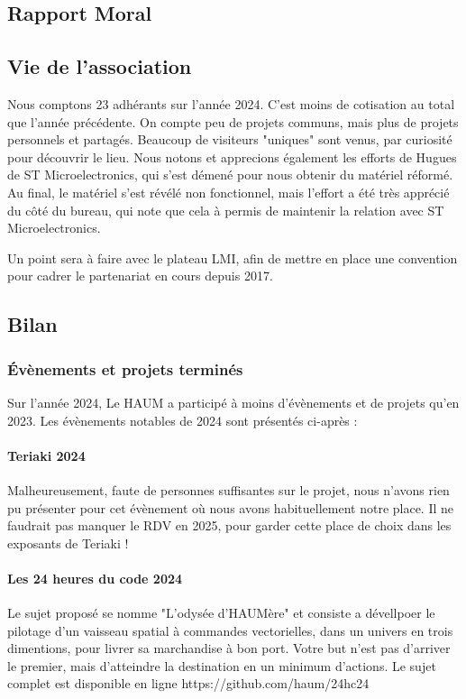 \documentclass[a4paper, 11pt]{article}
\begin{document}
\clearpage
\begin{appendices}
\section{Rapport Moral}

\subsection{Vie de l'association}

Nous comptons 23 adhérants sur l'année 2024. C'est moins de cotisation au total
que l'année précédente.
On compte peu de projets communs, mais plus de projets personnels et partagés.
Beaucoup de visiteurs "uniques" sont venus, par curiosité pour découvrir le lieu.
Nous notons et apprecions également les efforts de Hugues de ST Microelectronics, qui
s'est démené pour nous obtenir du matériel réformé. Au final, le matériel s'est révélé
non fonctionnel, mais l'effort a été très apprécié du côté du bureau, qui note que cela
à permis de maintenir la relation avec ST Microelectronics.

Un point sera à faire avec le plateau LMI, afin de mettre en place une convention
pour cadrer le partenariat en cours depuis 2017.

\subsection{Bilan}

\subsubsection{Évènements et projets terminés}

Sur l'année 2024, Le HAUM a participé à moins d'évènements et de projets qu'en 2023.
Les évènements notables de 2024 sont présentés ci-après :

\paragraph{Teriaki 2024} Malheureusement, faute de personnes suffisantes sur le projet,
nous n'avons rien pu présenter pour cet évènement où nous avons habituellement notre
place. Il ne faudrait pas manquer le RDV en 2025, pour garder cette place de choix dans
les exposants de Teriaki !

\paragraph{Les 24 heures du code 2024} Le sujet proposé se nomme "L'odysée d'HAUMère" et
consiste a dévellpoer le pilotage d'un vaisseau spatial à commandes vectorielles, dans un univers en trois dimentions, pour livrer sa marchandise à bon port.
Votre but n'est pas d'arriver le premier, mais d'atteindre la destination en un minimum d'actions.
Le sujet complet est disponible en ligne https://github.com/haum/24hc24


\end{appendices}
\end{document}
